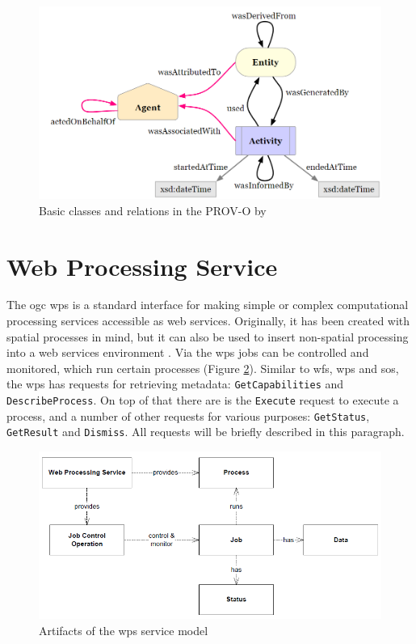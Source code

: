 \begin{figure}
	\centering
	\includegraphics[width=1\linewidth]{UML/PROV.png}
	\caption{Basic classes and relations in the PROV-O by \citep{LD:PROV}}
	\label{fig:PROV}
\end{figure}



\section{Web Processing Service}
The \ac{ogc} \acl{wps} is a standard interface for making simple or complex computational processing services accessible as web services. Originally, it has been created with spatial processes in mind, but it can also be used to insert non-spatial processing into a web services environment \citep[p. 8]{GEO:OGC}. Via the \ac{wps} jobs can be controlled and monitored, which run certain processes (Figure \ref{fig:WPSmodel}). Similar to \ac{wfs}, \ac{wps} and \ac{sos}, the \ac{wps} has requests for retrieving metadata: \texttt{GetCapabilities} and \texttt{DescribeProcess}. On top of that there are is the \texttt{Execute} request to execute a process, and a number of other requests for various purposes: \texttt{GetStatus}, \texttt{GetResult} and \texttt{Dismiss}. All requests will be briefly described in this paragraph.  

\begin{figure}
	\centering
	\includegraphics[width=1\linewidth]{UML/WPSmodel.png}
	\caption{Artifacts of the \ac{wps} service model \citep[p. 15]{GEO:OGC}}
	\label{fig:WPSmodel}
\end{figure}


